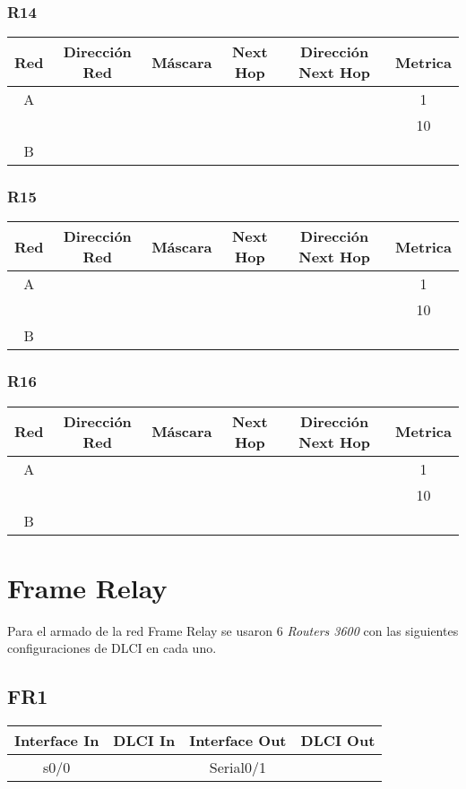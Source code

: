\documentclass[12pt,a4paper,spanish]{article}
\begin{document}
\subsubsection{R14}
\begin{tabular}{|c|c|c|c|c|c|}
	\hline
	Red & Dirección Red & Máscara & Next Hop & Dirección Next Hop & Metrica \\
	\hline
	\hline
	A &  &  &  &  & 1\\
 	  &  &  &  &  & 10 \\
	\hline	
	B & & & & &\\
	\hline
\end{tabular}

\subsubsection{R15}
\begin{tabular}{|c|c|c|c|c|c|}
	\hline
	Red & Dirección Red & Máscara & Next Hop & Dirección Next Hop & Metrica \\
	\hline
	\hline
	A &  &  &  &  & 1\\
 	  &  &  &  &  & 10 \\
	\hline	
	B & & & & &\\
	\hline
\end{tabular}

\subsubsection{R16}
\begin{tabular}{|c|c|c|c|c|c|}
	\hline
	Red & Dirección Red & Máscara & Next Hop & Dirección Next Hop & Metrica \\
	\hline
	\hline
	A &  &  &  &  & 1\\
 	  &  &  &  &  & 10 \\
	\hline	
	B & & & & &\\
	\hline
\end{tabular}

\newpage
\section{Frame Relay}
Para el armado de la red Frame Relay se usaron 6 \emph{Routers 3600}
con las siguientes configuraciones de DLCI en cada uno.
\subsection{FR1}
\begin{tabular}{|c|c|c|c|}
\hline
Interface In & DLCI In & Interface Out & DLCI Out \\
\hline
\hline
 s0/0 &  & Serial0/1 &  \\
\hline
\end{tabular}
\end{document}
